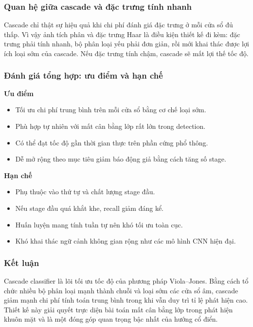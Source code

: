 \subsubsection{Quan hệ giữa cascade và đặc trưng tính nhanh}

Cascade chỉ thật sự hiệu quả khi chi phí đánh giá đặc trưng ở mỗi cửa sổ đủ thấp.
Vì vậy ảnh tích phân và đặc trưng Haar là điều kiện thiết kế đi kèm:
đặc trưng phải tính nhanh, bộ phân loại yếu phải đơn giản, rồi mới khai thác được lợi ích loại sớm của cascade.
Nếu đặc trưng tính chậm, cascade sẽ mất lợi thế tốc độ.

\subsubsection{Đánh giá tổng hợp: ưu điểm và hạn chế}

\noindent\textbf{Ưu điểm}
\begin{itemize}
  \item Tối ưu chi phí trung bình trên mỗi cửa sổ bằng cơ chế loại sớm.
  \item Phù hợp tự nhiên với mất cân bằng lớp rất lớn trong detection.
  \item Có thể đạt tốc độ gần thời gian thực trên phần cứng phổ thông.
  \item Dễ mở rộng theo mục tiêu giảm báo động giả bằng cách tăng số stage.
\end{itemize}

\noindent\textbf{Hạn chế}
\begin{itemize}
  \item Phụ thuộc vào thứ tự và chất lượng stage đầu.
  \item Nếu stage đầu quá khắt khe, recall giảm đáng kể.
  \item Huấn luyện mang tính tuần tự nên khó tối ưu toàn cục.
  \item Khó khai thác ngữ cảnh không gian rộng như các mô hình CNN hiện đại.
\end{itemize}

\subsubsection{Kết luận}

Cascade classifier là lõi tối ưu tốc độ của phương pháp Viola--Jones.
Bằng cách tổ chức nhiều bộ phân loại mạnh thành chuỗi và loại sớm các cửa sổ âm, cascade giảm mạnh chi phí tính toán trung bình trong khi vẫn duy trì tỉ lệ phát hiện cao.
Thiết kế này giải quyết trực diện bài toán mất cân bằng lớp trong phát hiện khuôn mặt và là một đóng góp quan trọng bậc nhất của hướng cổ điển.  \cite{viola2001rapid,viola2004robust,li2012facechapter}

